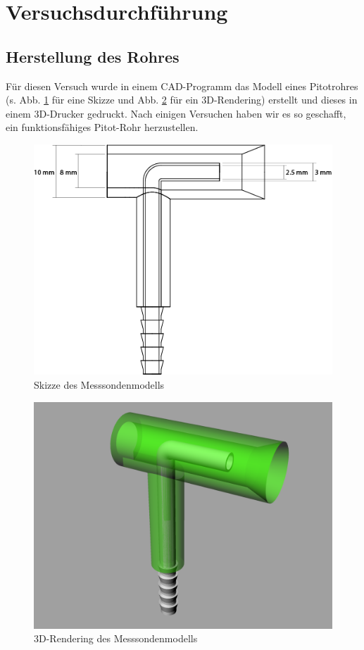 \section{Versuchsdurchführung}
\subsection{Herstellung des Rohres}
Für diesen Versuch wurde in einem CAD-Programm das Modell eines Pitotrohres (s. Abb. \ref{skizze-ks} für eine Skizze und Abb. \ref{render-ks} für ein 3D-Rendering) erstellt und dieses in einem 3D-Drucker gedruckt. Nach einigen Versuchen haben wir es so geschafft, ein funktionsfähiges Pitot-Rohr herzustellen.
\begin{figure}
\centering
	\includegraphics[width=.8\textwidth]{images/ks-zeichnung.png}
	\caption{Skizze des Messsondenmodells}
	\label{skizze-ks}
\end{figure}
\begin{figure}
\centering
	\includegraphics[width=.8\textwidth]{images/ks-render.png}
	\caption{3D-Rendering des Messsondenmodells}
	\label{render-ks}
\end{figure}
